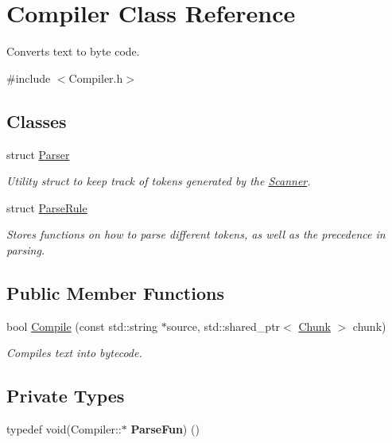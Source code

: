 \hypertarget{class_compiler}{}\section{Compiler Class Reference}
\label{class_compiler}


Converts text to byte code.  




{\ttfamily \#include $<$Compiler.\+h$>$}

\subsection*{Classes}
\begin{DoxyCompactItemize}
\item 
struct \hyperlink{struct_compiler_1_1_parser}{Parser}
\begin{DoxyCompactList}\small\item\em Utility struct to keep track of tokens generated by the \hyperlink{class_scanner}{Scanner}. \end{DoxyCompactList}\item 
struct \hyperlink{struct_compiler_1_1_parse_rule}{Parse\+Rule}
\begin{DoxyCompactList}\small\item\em Stores functions on how to parse different tokens, as well as the precedence in parsing. \end{DoxyCompactList}\end{DoxyCompactItemize}
\subsection*{Public Member Functions}
\begin{DoxyCompactItemize}
\item 
bool \hyperlink{class_compiler_acab82bf3a56c9891021aa1341ac639d3}{Compile} (const std\+::string $\ast$source, std\+::shared\+\_\+ptr$<$ \hyperlink{class_chunk}{Chunk} $>$ chunk)
\begin{DoxyCompactList}\small\item\em Compiles text into bytecode. \end{DoxyCompactList}\end{DoxyCompactItemize}
\subsection*{Private Types}
\begin{DoxyCompactItemize}
\item 
\mbox{\label{class_compiler_a0ff2f52c45d2c93eb8f6f1c121992405}} 
typedef void(Compiler\+::$\ast$ {\bfseries Parse\+Fun}) ()
\end{DoxyCompactItemize}
